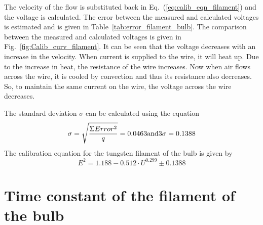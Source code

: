 The velocity of the flow is substituted back in Eq.~(\ref{eq:calib_eqn_filament}) and the voltage is calculated. The error between the measured and calculated voltages is estimated and is given in Table~\ref{tab:error_filament_bulb}. The comparison between the measured and calculated voltages is given in Fig.~\ref{fig:Calib_curv_filament}. It can be seen that the voltage decreases with an increase in the velocity. When current is supplied to the wire, it will heat up. Due to the increase in heat, the resistance of the wire increases. Now when air flows across the wire, it is cooled by convection and thus its resistance also decreases. So, to maintain the same current on the wire, the voltage across the wire decreases. 

The standard deviation $\sigma$ can be calculated using the equation
\begin{equation}
    \sigma = \sqrt{\frac{\Sigma Error^2}{q}} = 0.0463\\ \text{and}\\
    3\sigma = 0.1388
\end{equation}
The calibration equation for the tungsten filament of the bulb is given by
\begin{equation}
    E^2 = 1.188 - 0.512\cdot U^{0.299} \pm 0.1388
\end{equation}

\section{Time constant of the filament of the bulb}

